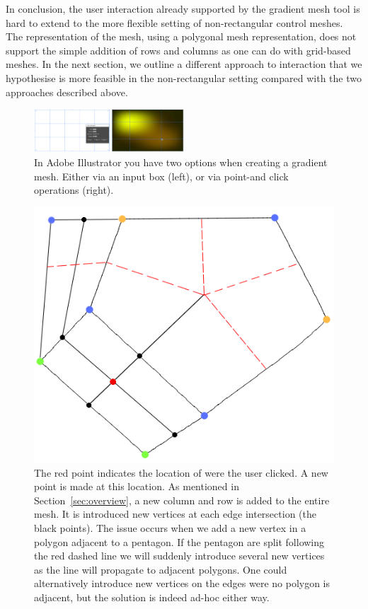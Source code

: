 \documentclass{egpubl}
\begin{document}
In conclusion, the user interaction already supported by the gradient mesh tool is hard to extend to the more flexible setting of non-rectangular control meshes. The representation of the mesh, using a polygonal mesh representation, does not support the simple addition of rows and columns as one can do with grid-based meshes. In the next section, we outline a different approach to interaction that we hypothesise is more feasible in the non-rectangular setting compared with the two approaches described above.

\begin{figure}[t]
	\includegraphics[width=0.5\textwidth]{IllustratorCreateGradientMeshCombined.png}
	\caption{In Adobe Illustrator you have two options when creating a gradient mesh. Either via an input box (left), or via  point-and click operations (right).}
	\label{fig:illustratorCreateMesh}
\end{figure}

\begin{figure}[t]
	\centering
	\includegraphics[height=0.25\textheight]{pentagonMesh.png}
	\caption{The red point indicates the location of were the user clicked. A new point is made at this location. As mentioned in Section~\ref{sec:overview}, a new column and row is added to the entire mesh. It is introduced new vertices at each edge intersection (the black points). The issue occurs when we add a new vertex in a polygon adjacent to a pentagon. If the pentagon are split following the red dashed line we will suddenly introduce several new vertices as the line will propagate to adjacent polygons. One could alternatively introduce new vertices on the edges were no polygon is adjacent, but the solution is indeed ad-hoc either way. }
	\label{fig:adHocPentagon}
\end{figure}
\end{document}

